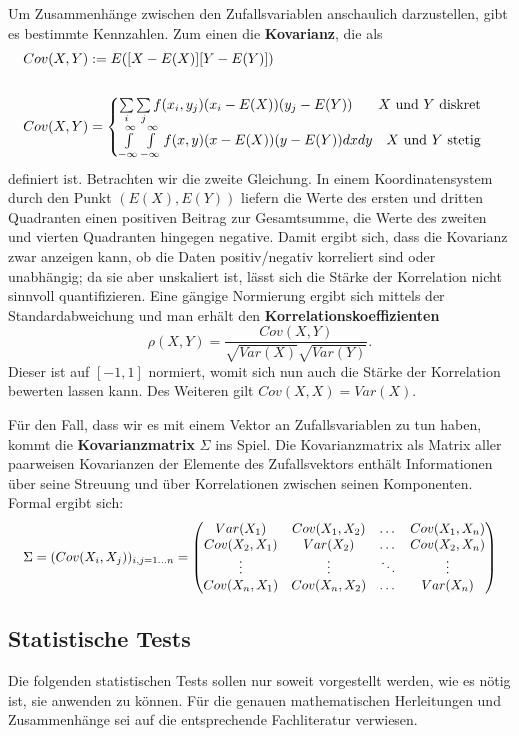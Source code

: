 Um Zusammenhänge zwischen den Zufallsvariablen anschaulich darzustellen, gibt es bestimmte Kennzahlen. Zum einen die \textbf{Kovarianz}, die als
\begin{align*}
	Cov(X,Y) &:= E([X-E(X)][Y-E(Y)])\\
	\\
	Cov(X,Y) &= 
		\begin{cases}
		\sum\limits_i \sum\limits_j f(x_i,y_j)(x_i-E(X))(y_j-E(Y)) \hfill X \text{ und } Y \text{ diskret}\\
		\int\limits_{-\infty}^{\infty} \int\limits_{-\infty}^{\infty} f(x,y)(x-E(X))(y-E(Y))dxdy\quad X \text{ und } Y \text{ stetig}\\
		\end{cases}
\end{align*}
definiert ist. Betrachten wir die zweite Gleichung. In einem Koordinatensystem
durch den Punkt \((E(X),E(Y))\) liefern die Werte des ersten und dritten
Quadranten einen positiven Beitrag zur Gesamtsumme, die Werte des zweiten und
vierten Quadranten hingegen negative. Damit ergibt sich, dass die Kovarianz
zwar anzeigen kann, ob die Daten positiv/negativ korreliert sind oder
unabhängig; da sie aber unskaliert ist, lässt sich die Stärke der Korrelation
nicht sinnvoll quantifizieren.
Eine gängige Normierung ergibt sich mittels der Standardabweichung und man erhält den \textbf{Korrelationskoeffizienten} 
\[
	\rho(X,Y) = \frac{Cov(X,Y)}{\sqrt{Var(X)} \sqrt{Var(Y)}}.
\] 
Dieser ist auf \([-1,1]\) normiert, womit sich nun auch die Stärke der Korrelation bewerten lassen kann. Des Weiteren gilt \(Cov(X,X)=Var(X)\).

Für den Fall, dass wir es mit einem Vektor an Zufallsvariablen zu tun haben, kommt die \textbf{Kovarianzmatrix} \(\Sigma\) ins Spiel. Die Kovarianzmatrix als Matrix aller paarweisen Kovarianzen der Elemente des Zufallsvektors enthält Informationen über seine Streuung und über Korrelationen zwischen seinen Komponenten.
Formal ergibt sich:
\[
	\resizebox{\textwidth}{!}{
		\(\Sigma = (Cov(X_i,X_j))_{i,j = 1\dots n} = 
		\begin{pmatrix}
			Var(X_1) & Cov(X_1,X_2) &\dots & Cov(X_1,X_n)\\
			Cov(X_2,X_1)& Var(X_2) &\dots & Cov(X_2,X_n)\\
			\vdots &\vdots &\ddots &\vdots\\
			Cov(X_n,X_1) & Cov(X_n,X_2) &\dots &Var(X_n)
		\end{pmatrix}\)
	}
\] 

\subsection{Statistische Tests}
Die folgenden statistischen Tests sollen nur soweit vorgestellt werden, wie es nötig ist, sie anwenden zu können.
Für die genauen mathematischen Herleitungen und Zusammenhänge sei auf die entsprechende Fachliteratur verwiesen.

